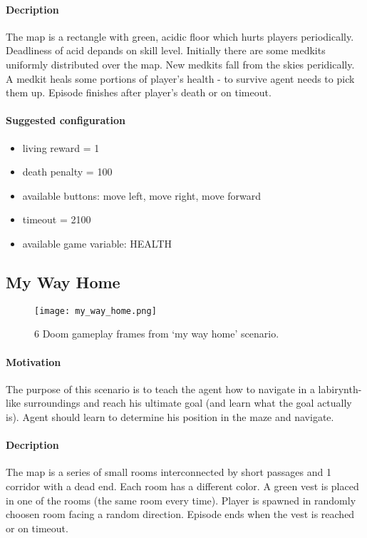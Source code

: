 		\paragraph{Decription}
			The map is a rectangle with green, acidic floor which hurts players periodically. Deadliness of acid depands on skill level. Initially there are some medkits uniformly distributed over the map. New medkits fall from the skies peridically. A medkit heals some portions of player's health - to survive agent needs to pick them up. Episode finishes after player's death or on timeout.

		\paragraph{Suggested configuration}
		\begin{itemize}
			\item living reward = 1
			\item death penalty = 100
			\item available buttons: move left, move right, move forward
			\item timeout = 2100
			\item available game variable: HEALTH
		\end{itemize}
	\newpage

	\subsection{My Way Home}
		\begin{figure}
			\centering
			\texttt{[image: my\_way\_home.png]}
			\caption{6 Doom gameplay frames from `my way home' scenario.}\label{fig:my_way_home}
		\end{figure}
		\paragraph{Motivation} 
			The purpose of this scenario is to teach the agent how to navigate in a labirynth-like surroundings and reach his ultimate goal (and learn what the goal actually is). Agent should learn to determine his position in the maze and navigate.

		\paragraph{Decription}
			The map is a series of small rooms interconnected by short passages and 1 corridor with a dead end. Each room has a different color. A green vest is placed in one of the rooms (the same room every time). Player is spawned in randomly choosen room facing a random direction. Episode ends when the vest is reached or on timeout.
